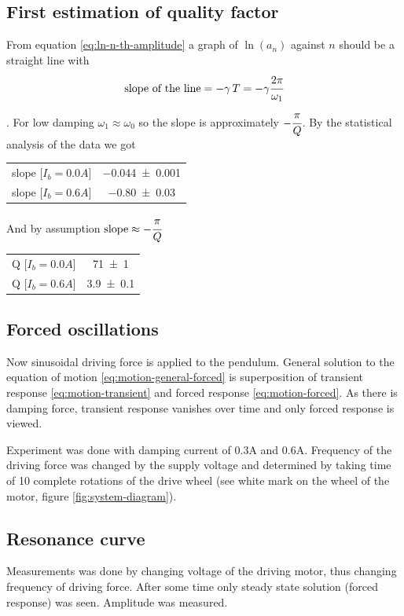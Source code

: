 \documentclass[12pt,a4paper]{article}
\begin{document}
	\subsection{First estimation of quality factor} \label{section:qualiti-factor-estimation}
	From equation \ref{eq:ln-n-th-amplitude} a graph of $\ln(a_n)$ against $n$ should be a straight line with 
	\begin{equation}
	\text{slope of the line} =  -\gamma \, T = -\gamma \cfrac{2 \pi}{\omega_1}
	\end{equation}. 
	For low damping $\omega_1 \approx \omega_0$ so the slope is approximately $-\cfrac{\pi}{Q}$.
	By the statistical analysis of the data we got
	\begin{table}[H]\centering
	\begin{tabular}{c c} 
		\toprule
		slope [$I_b=0.0A]$ & \num{-0.044 \pm 0.001}\\
		slope [$I_b=0.6A]$ & \num{-0.80 \pm 0.03} \\
		\bottomrule
	\end{tabular}
	\end{table}
	And by assumption $\text{slope} \approx -\cfrac{\pi}{Q}$
	\begin{table}[H]\centering
		\begin{tabular}{c c} 
			\toprule
			Q [$I_b=0.0A$] & \num{71 \pm 1} \\
			Q [$I_b=0.6A$] & \num{3.9 \pm 0.1} \\
			\bottomrule
		\end{tabular}
	\end{table}
   	\subsection{Forced oscillations}
   	Now sinusoidal driving force is applied to the pendulum. General solution to the equation of motion \ref{eq:motion-general-forced} is superposition of transient response \eqref{eq:motion-transient} and forced response \eqref{eq:motion-forced}. As there is damping force, transient response vanishes over time and only forced response is viewed.
   	
   	Experiment was done with damping current of \num{0.3}\si{\ampere} and \num{0.6}\si{\ampere}. Frequency of the driving force was changed by the supply voltage and determined by taking time of 10 complete rotations of the drive wheel (see white mark on the wheel of the motor, figure \ref{fig:system-diagram}).
   	\subsection{Resonance curve}
   	Measurements was done by changing voltage of the driving motor, thus changing frequency of driving force. After some time only steady state solution (forced response) was seen. Amplitude was measured.
   	 
\end{document}
